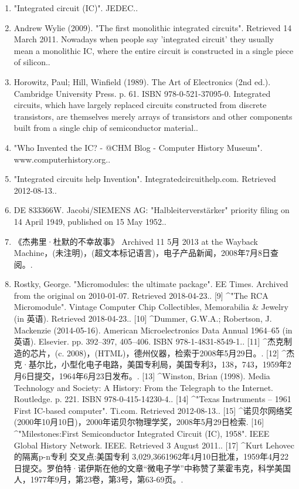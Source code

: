 \begin{enumerate}
\item "Integrated circuit (IC)". JEDEC..
\item Andrew Wylie (2009). "The first monolithic integrated circuits". Retrieved 14 March 2011. Nowadays when people say 'integrated circuit' they usually mean a monolithic IC, where the entire circuit is constructed in a single piece of silicon..
\item Horowitz, Paul; Hill, Winfield (1989). The Art of Electronics (2nd ed.). Cambridge University Press. p. 61. ISBN 978-0-521-37095-0. Integrated circuits, which have largely replaced circuits constructed from discrete transistors, are themselves merely arrays of transistors and other components built from a single chip of semiconductor material..
\item "Who Invented the IC? - @CHM Blog - Computer History Museum". www.computerhistory.org..
\item "Integrated circuits help Invention". Integratedcircuithelp.com. Retrieved 2012-08-13..
\item DE 833366W. Jacobi/SIEMENS AG: "Halbleiterverstärker" priority filing on 14 April 1949, published on 15 May 1952..
\item 《杰弗里·杜默的不幸故事》 Archived 11 5月 2013 at the Wayback Machine，(未注明)，(超文本标记语言)，电子产品新闻，2008年7月8日查阅。.
\item Rostky, George. "Micromodules: the ultimate package". EE Times. Archived from the original on 2010-01-07. Retrieved 2018-04-23..
[9]
^"The RCA Micromodule". Vintage Computer Chip Collectibles, Memorabilia & Jewelry (in 英语). Retrieved 2018-04-23..
[10]
^Dummer, G.W.A.; Robertson, J. Mackenzie (2014-05-16). American Microelectronics Data Annual 1964–65 (in 英语). Elsevier. pp. 392–397, 405–406. ISBN 978-1-4831-8549-1..
[11]
^杰克制造的芯片，(c. 2008)，(HTML)，德州仪器，检索于2008年5月29日。.
[12]
^杰克·基尔比，小型化电子电路，美国专利局，美国专利3，138，743，1959年2月6日提交，1964年6月23日发布。.
[13]
^Winston, Brian (1998). Media Technology and Society: A History: From the Telegraph to the Internet. Routledge. p. 221. ISBN 978-0-415-14230-4..
[14]
^"Texas Instruments – 1961 First IC-based computer". Ti.com. Retrieved 2012-08-13..
[15]
^诺贝尔网络奖(2000年10月10日)，2000年诺贝尔物理学奖，2008年5月29日检索.
[16]
^"Milestones:First Semiconductor Integrated Circuit (IC), 1958". IEEE Global History Network. IEEE. Retrieved 3 August 2011..
[17]
^Kurt Lehovec的隔离p-n专利 交叉点:美国专利 3,029,3661962年4月10日批准，1959年4月22日提交。罗伯特·诺伊斯在他的文章“微电子学”中称赞了莱霍韦克，科学美国人，1977年9月，第23卷，第3号，第63-69页。.

\end{enumerate}
